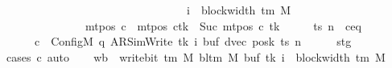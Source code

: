\begin{isabellebody}
\ \ \ \ \ \ \ \ \ \ \ \ \ \ \ \ \ \ \ \ \ \ \ \ \ \ \ \ \ \ \ \ \ {\isacharparenleft}{\kern0pt}i\ {\isacharminus}{\kern0pt}\ block{\isacharunderscore}{\kern0pt}width\ {\isacharparenleft}{\kern0pt}{\isasymGamma}{\isacharunderscore}{\kern0pt}tm\ M{\isacharparenright}{\kern0pt}{\isacharparenright}{\kern0pt}{\isacharparenright}{\kern0pt}{\isacharparenright}{\kern0pt}\isanewline
\ \ \ \ \ \ \ \ \ \ \ \ \ \ {\isasymand}\ mt{\isacharunderscore}{\kern0pt}pos\ c{\isacharprime}{\kern0pt}{\isacharprime}{\kern0pt}\ {\isacharequal}{\kern0pt}\ {\isacharparenleft}{\kern0pt}mt{\isacharunderscore}{\kern0pt}pos\ c{\isacharprime}{\kern0pt}{\isacharparenright}{\kern0pt}{\isacharparenleft}{\kern0pt}tk\ {\isacharcolon}{\kern0pt}{\isacharequal}{\kern0pt}\ Suc\ {\isacharparenleft}{\kern0pt}mt{\isacharunderscore}{\kern0pt}pos\ c{\isacharprime}{\kern0pt}\ tk{\isacharparenright}{\kern0pt}{\isacharparenright}{\kern0pt}{\isachardoublequoteclose}\isanewline
%
\isadelimproof
%
\endisadelimproof
%
\isatagproof
{}\isamarkupfalse%
\ {\isacharminus}{\kern0pt}\isanewline
\ \ \isamarkupfalse%
\ ts\ n\ \ c{\isacharprime}{\kern0pt}{\isacharunderscore}{\kern0pt}eq{\isacharcolon}{\kern0pt}\isanewline
\ \ \ \ \ \ {\isachardoublequoteopen}c{\isacharprime}{\kern0pt}\ {\isacharequal}{\kern0pt}\ Config\isactrlsub M\ {\isacharparenleft}{\kern0pt}q{\isacharcomma}{\kern0pt}\ AR{\isacharunderscore}{\kern0pt}SimWrite{\isacharcomma}{\kern0pt}\ tk{\isacharcomma}{\kern0pt}\ i{\isacharcomma}{\kern0pt}\ buf{\isacharcomma}{\kern0pt}\ dvec{\isacharcomma}{\kern0pt}\ posk{\isacharparenright}{\kern0pt}\ ts\ n{\isachardoublequoteclose}\isanewline
\ \ \ \ \isamarkupfalse%
\ stg\ \isamarkupfalse%
\ {\isacharparenleft}{\kern0pt}cases\ c{\isacharprime}{\kern0pt}{\isacharparenright}{\kern0pt}\ auto\isanewline
\ \ \isamarkupfalse%
\ {\isacharquery}{\kern0pt}wb\ {\isacharequal}{\kern0pt}\ {\isachardoublequoteopen}write{\isacharunderscore}{\kern0pt}bit\ {\isacharparenleft}{\kern0pt}{\isasymGamma}{\isacharunderscore}{\kern0pt}tm\ M{\isacharparenright}{\kern0pt}\ {\isacharparenleft}{\kern0pt}bl{\isacharunderscore}{\kern0pt}tm\ M{\isacharparenright}{\kern0pt}\ {\isacharparenleft}{\kern0pt}buf\ tk{\isacharparenright}{\kern0pt}\ {\isacharparenleft}{\kern0pt}i\ {\isacharminus}{\kern0pt}\ block{\isacharunderscore}{\kern0pt}width\ {\isacharparenleft}{\kern0pt}{\isasymGamma}{\isacharunderscore}{\kern0pt}tm\ M{\isacharparenright}{\kern0pt}{\isacharparenright}{\kern0pt}{\isachardoublequoteclose}\isanewline
\ \ \isamarkupfalse%

\end{isabellebody}
